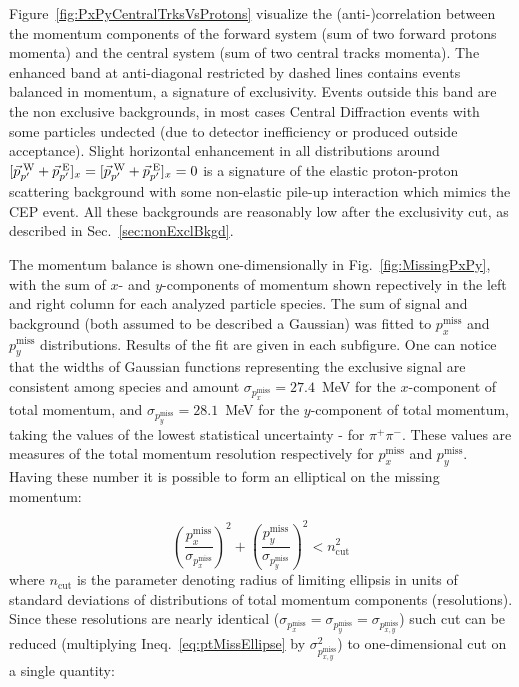 Figure~\ref{fig:PxPyCentralTrksVsProtons} visualize the (anti-)correlation between the momentum components of the forward system (sum of two forward protons momenta) and the central system (sum of two central tracks momenta). The enhanced band at anti-diagonal restricted by dashed lines contains events balanced in momentum, a signature of exclusivity. Events outside this band are the non exclusive backgrounds, in most cases Central Diffraction events with some particles undected (due to detector inefficiency or produced outside acceptance). Slight horizontal enhancement in all distributions around $[\vec{p}^{\hspace*{2pt}\text{W}}_{p'}+\vec{p}^{\hspace*{2pt}\text{E}}_{p'}]_{x} = [\vec{p}^{\hspace*{2pt}\text{W}}_{p'}+\vec{p}^{\hspace*{2pt}\text{E}}_{p'}]_{x} =0$ is a signature of the elastic proton-proton scattering background with some non-elastic pile-up interaction which mimics the CEP event. All these backgrounds are reasonably low after the exclusivity cut, as described in Sec.~\ref{sec:nonExclBkgd}.

The momentum balance is shown one-dimensionally in Fig.~\ref{fig:MissingPxPy}, with the sum of $x$- and $y$-components of momentum shown repectively in the left and right column for each analyzed particle species. The sum of signal and background (both assumed to be described a Gaussian) was fitted to $p_{x}^{\text{miss}}$ and $p_{y}^{\text{miss}}$ distributions. Results of the fit are given in each subfigure. One can notice that the widths of Gaussian functions representing the exclusive signal are consistent among species and amount $\sigma_{p_{x}^{\text{miss}}}=27.4$~MeV for the $x$-component of total momentum, and $\sigma_{p_{y}^{\text{miss}}}=28.1$~MeV for the $y$-component of total momentum, taking the values of the lowest statistical uncertainty - for $\pi^{+}\pi^{-}$. These values are measures of the total momentum resolution respectively for $p_{x}^{\text{miss}}$ and $p_{y}^{\text{miss}}$. Having these number it is possible to form an elliptical on the missing momentum:

\begin{equation}\label{eq:ptMissEllipse}%
\left(\frac{p_{x}^{\text{miss}}}{\sigma_{p_{x}^{\text{miss}}}}\right)^{2} + \left(\frac{p_{y}^{\text{miss}}}{\sigma_{p_{y}^{\text{miss}}}}\right)^{2} < n_{\text{cut}}^{2}
\end{equation}
%
where $n_{\text{cut}}$ is the parameter denoting radius of limiting ellipsis in units of standard deviations of distributions of total momentum components (resolutions). Since these resolutions are nearly identical ($\sigma_{p_{x}^{\text{miss}}} = \sigma_{p_{y}^{\text{miss}}} = \sigma_{p_{x,y}^{\text{miss}}}$) such cut can be reduced (multiplying Ineq.~\ref{eq:ptMissEllipse} by $\sigma_{p_{x,y}^{\text{miss}}}^{2}$) to one-dimensional cut on a single quantity:

